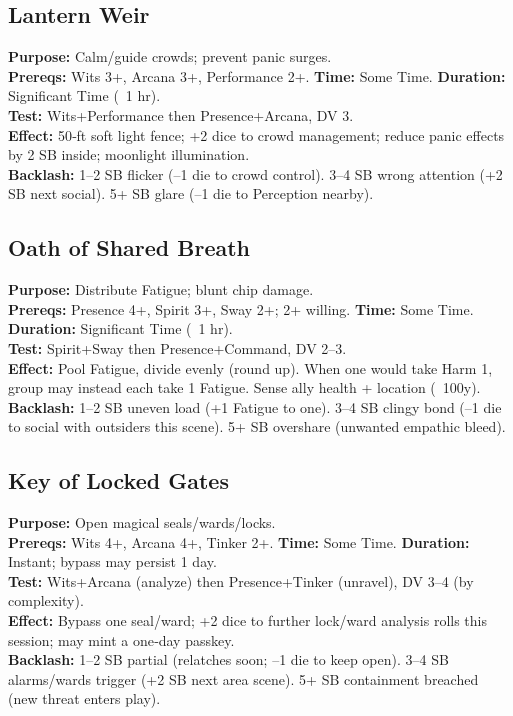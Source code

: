 \subsection*{Lantern Weir}
\textbf{Purpose:} Calm/guide crowds; prevent panic surges.\\
\textbf{Prereqs:} Wits 3+, Arcana 3+, Performance 2+. \quad \textbf{Time:} Some Time. \quad \textbf{Duration:} Significant Time (~1 hr).\\
\textbf{Test:} Wits+Performance then Presence+Arcana, DV 3.\\
\textbf{Effect:} 50‑ft soft light fence; +2 dice to crowd management; reduce panic effects by 2 SB inside; moonlight illumination.\\
\textbf{Backlash:} 1--2 SB flicker (--1 die to crowd control). 3--4 SB wrong attention (+2 SB next social). 5+ SB glare (--1 die to Perception nearby).

\subsection*{Oath of Shared Breath}
\textbf{Purpose:} Distribute Fatigue; blunt chip damage.\\
\textbf{Prereqs:} Presence 4+, Spirit 3+, Sway 2+; 2+ willing. \quad \textbf{Time:} Some Time. \quad \textbf{Duration:} Significant Time (~1 hr).\\
\textbf{Test:} Spirit+Sway then Presence+Command, DV 2--3.\\
\textbf{Effect:} Pool Fatigue, divide evenly (round up). When one would take Harm 1, group may instead each take 1 Fatigue. Sense ally health + location (~100y).\\
\textbf{Backlash:} 1--2 SB uneven load (+1 Fatigue to one). 3--4 SB clingy bond (--1 die to social with outsiders this scene). 5+ SB overshare (unwanted empathic bleed).

\subsection*{Key of Locked Gates}
\textbf{Purpose:} Open magical seals/wards/locks.\\
\textbf{Prereqs:} Wits 4+, Arcana 4+, Tinker 2+. \quad \textbf{Time:} Some Time. \quad \textbf{Duration:} Instant; bypass may persist 1 day.\\
\textbf{Test:} Wits+Arcana (analyze) then Presence+Tinker (unravel), DV 3--4 (by complexity).\\
\textbf{Effect:} Bypass one seal/ward; +2 dice to further lock/ward analysis rolls this session; may mint a one‑day passkey.\\
\textbf{Backlash:} 1--2 SB partial (relatches soon; --1 die to keep open). 3--4 SB alarms/wards trigger (+2 SB next area scene). 5+ SB containment breached (new threat enters play).

